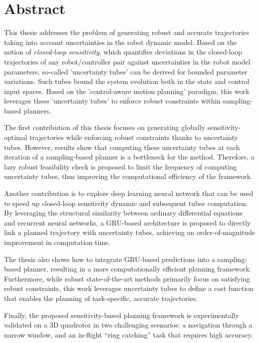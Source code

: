 \chapter*{Abstract}

This thesis addresses the problem of generating robust and accurate trajectories taking into account uncertainties in the robot dynamic model. 
Based on the notion of \emph{closed-loop sensitivity}, which quantifies deviations in the closed-loop trajectories of any robot/controller pair against uncertainties in the robot model parameters, so-called 'uncertainty tubes' can be derived for bounded parameter variations.
Such tubes bound the system evolution both in the state and control input spaces.
Based on the 'control-aware motion planning' paradigm, this work leverages these 'uncertainty tubes' to enforce robust constraints within sampling-based planners.

The first contribution of this thesis focuses on generating globally sensitivity-optimal trajectories while enforcing robust constraints thanks to uncertainty tubes.
However, results show that computing these uncertainty tubes at each iteration of a sampling-based planner is a bottleneck for the method.
Therefore, a lazy robust feasibility check is proposed to limit the frequency of computing uncertainty tubes, thus improving the computational efficiency of the framework.

Another contribution is to explore deep learning neural network that can be used to speed up closed-loop sensitivity dynamic and subsequent tubes computation.
By leveraging the structural similarity between ordinary differential equations and recurrent neural networks, a GRU-based architecture is proposed to directly link a planned trajectory with uncertainty tubes, achieving an order-of-magnitude improvement in computation time.

The thesis also shows how to integrate GRU-based predictions into a sampling-based planner, resulting in a more computationally efficient planning framework. 
Furthermore, while robust state-of-the-art methods primarily focus on satisfying robust constraints, this work leverages uncertainty tubes to define a cost function that enables the planning of task-specific, accurate trajectories.

Finally, the proposed sensitivity-based planning framework is experimentally validated on a 3D quadrotor in two challenging scenarios: a navigation through a narrow window, and an in-flight ``ring catching'' task that requires high accuracy. 